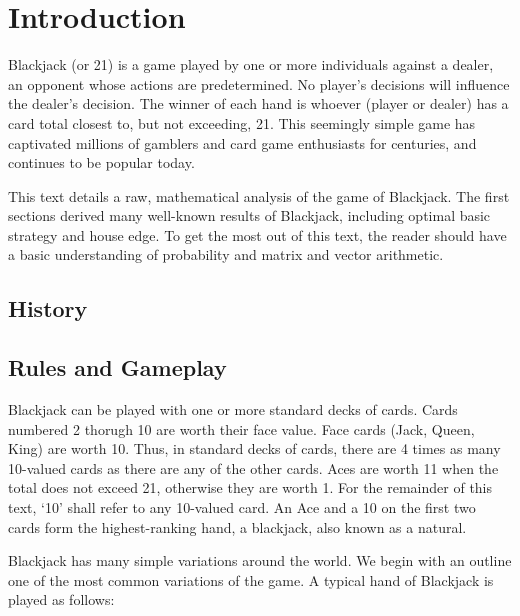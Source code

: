 
\chapter{Introduction}
\label{sec:intro}

Blackjack (or 21) is a game played by one or more individuals against
a dealer, an opponent whose actions are predetermined.
No player's decisions will influence the dealer's decision.  
The winner of each hand is whoever (player or dealer)
has a card total closest to, but not exceeding, 21.  
This seemingly simple game has captivated millions of gamblers
and card game enthusiasts for centuries, 
and continues to be popular today.

This text details a raw, mathematical analysis of the game of Blackjack.
The first sections derived many well-known results of Blackjack, 
including optimal basic strategy and house edge.
To get the most out of this text, the reader should have a 
basic understanding of probability and matrix and vector arithmetic.



\section{History}
\label{sec:intro:history}


\section{Rules and Gameplay}
\label{sec:intro:rules}

Blackjack can be played with one or more standard decks of cards.
Cards numbered 2 thorugh 10 are worth their face value.  
Face cards (Jack, Queen, King) are worth 10.
Thus, in standard decks of cards, there are 4 times as many 10-valued 
cards as there are any of the other cards.
Aces are worth 11 when the total does not exceed 21, 
otherwise they are worth 1.
For the remainder of this text, `10' shall refer to any 10-valued card.
An Ace and a 10 on the first two cards form the 
highest-ranking hand, a blackjack, 
also known as a natural.

Blackjack has many simple variations around the world.
We begin with an outline one of the most common variations of the game.
A typical hand of Blackjack is played as follows:

